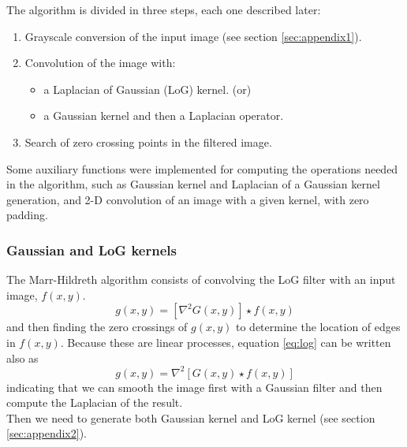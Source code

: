 \documentclass{ipol}
\numberwithin{equation}{section}
\numberwithin{table}{section}
\numberwithin{figure}{section}
\begin{document}
The algorithm is divided in three steps, each one described later:
\begin{enumerate}
	\item Grayscale conversion of the input image (see section \ref{sec:appendix1}).
	\item Convolution of the image with:
	\begin{itemize}
		\item a Laplacian of Gaussian (LoG) kernel. (or)
		\item a Gaussian kernel and then a Laplacian operator.
	\end{itemize}
	\item Search of zero crossing points in the filtered image.\\
\end{enumerate}

Some auxiliary functions were implemented for computing the operations
needed in the algorithm, such as Gaussian kernel and Laplacian of a Gaussian 
kernel generation, and 2-D convolution of an image with a given kernel, 
with zero padding.\\



\subsubsection{Gaussian and LoG kernels}

The Marr-Hildreth algorithm consists of convolving the LoG filter with an input image, $f(x,y)$.
\begin{equation}\label{eq:log}
  g(x,y) = [\nabla^2G(x,y)]\star f(x,y)
\end{equation}
and then finding the zero crossings of $g(x,y)$ to determine the location of edges in $f(x,y)$. 
Because these are linear processes, equation \ref{eq:log} can be written also as
\begin{equation}
  g(x,y) = \nabla^2[G(x,y)\star f(x,y)]
\end{equation}
indicating that we can smooth the image first with a Gaussian filter and then compute the Laplacian of the result.\\

Then we need to generate both Gaussian kernel and LoG kernel (see section \ref{sec:appendix2}).\\
\end{document}
